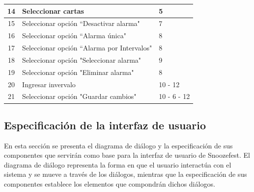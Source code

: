 \begin{table}[H]
\begin{tabular}{| c | l | l |}
        \hline
        14 & Seleccionar cartas & 5 \\
        \hline
        15 & Seleccionar opción ``Desactivar alarma" & 7 \\
        \hline
        16 & Seleccionar opción ``Alarma única" & 8 \\
        \hline
        17 & Seleccionar opción ``Alarma por Intervalos" & 8 \\
        \hline
        18 & Seleccionar opción "Seleccionar alarma" & 9 \\
        \hline
        19 & Seleccionar opción "Eliminar alarma" & 8 \\
        \hline
        20 & Ingresar invervalo & 10 - 12 \\
        \hline
        21 & Seleccionar opción "Guardar cambios" & 10 - 6 - 12 \\
        \hline
    \end{tabular}    
    
    \label{table:2}
\end{table}

\subsection{Especificación de la interfaz de usuario}
En esta sección se presenta el diagrama de diálogo y la especificación de sus componentes que servirán como base para la interfaz de usuario de Snoozefest. El diagrama de diálogo representa la forma en que el usuario interactúa con el sistema y se mueve a través de los diálogos, mientras que la especificación de sus componentes establece los elementos que compondrán dichos diálogos.

